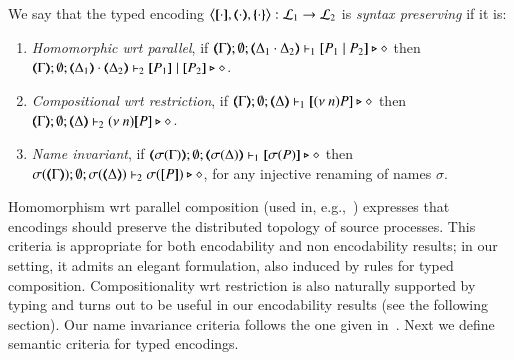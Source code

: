 \begin{definition}\myrm
	\label{def:sep}
	We say that 
	the typed encoding 
	$\enco{\map{\cdot}, \mapt{\cdot}, \mapa{\cdot}}: \tyl{L}_1 \to \tyl{L}_2$ is \emph{syntax preserving}
	if it is:
	
	\begin{enumerate}[1.]
		\item	\emph{Homomorphic wrt parallel},   if 
		$\mapt{\Gamma}; \emptyset; \mapt{\Delta_1 \cat \Delta_2} \proves_1 \map{P_1 \Par P_2} \hastype \Proc$
		then \\
		$\mapt{\Gamma}; \emptyset; \mapt{\Delta_1} \cat \mapt{\Delta_2} \proves_2 \map{P_1} \Par \map{P_2} \hastype \Proc$.

		\item	\emph{Compositional wrt restriction},  if 
		$\mapt{\Gamma}; \emptyset; \mapt{\Delta} \proves_1 \map{\news{n}P} \hastype \Proc$
		then \\
		$\mapt{\Gamma}; \emptyset; \mapt{\Delta} \proves_2 \news{n}\map{P} \hastype \Proc$.
		
		\item \emph{Name invariant},   if
		$\mapt{\sigma(\Gamma)}; \emptyset; \mapt{\sigma(\Delta)} \proves_1 \map{\sigma(P)} \hastype \Proc$
		then \\
		$\sigma(\mapt{\Gamma}); \emptyset; \sigma(\mapt{\Delta}) \proves_2 \sigma(\map{P}) \hastype \Proc$, 
		for any injective renaming  of names $\sigma$.
	\end{enumerate}
\end{definition}
%
Homomorphism wrt parallel composition (used in, e.g.,~\cite{Palamidessi03,DBLP:conf/lics/PalamidessiSVV06})
expresses that encodings should preserve the distributed topology of source processes. This criteria 
is appropriate for both encodability and non encodability results; in our setting, 
it admits an elegant formulation, also induced by rules for typed composition.
Compositionality wrt restriction is 
also naturally supported by typing and turns out to be 
useful in our encodability results (see the following section).
Our name invariance criteria follows the one given in~\cite{DBLP:journals/iandc/Gorla10,DBLP:conf/icalp/LanesePSS10}. 
Next we define semantic criteria for typed encodings.


